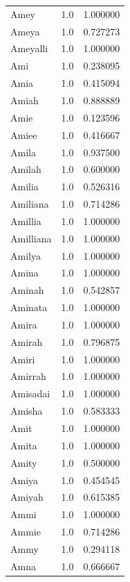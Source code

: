 \documentclass[
  letterpaper,
  DIV=11,
  numbers=noendperiod]{scrreprt}
\begin{document}
\begin{tabular}{lrr}
Amey            &   1.0 &   1.000000 \\
Ameya           &   1.0 &   0.727273 \\
Ameyalli        &   1.0 &   1.000000 \\
Ami             &   1.0 &   0.238095 \\
Amia            &   1.0 &   0.415094 \\
Amiah           &   1.0 &   0.888889 \\
Amie            &   1.0 &   0.123596 \\
Amiee           &   1.0 &   0.416667 \\
Amila           &   1.0 &   0.937500 \\
Amilah          &   1.0 &   0.600000 \\
Amilia          &   1.0 &   0.526316 \\
Amiliana        &   1.0 &   0.714286 \\
Amillia         &   1.0 &   1.000000 \\
Amilliana       &   1.0 &   1.000000 \\
Amilya          &   1.0 &   1.000000 \\
Amina           &   1.0 &   1.000000 \\
Aminah          &   1.0 &   0.542857 \\
Aminata         &   1.0 &   1.000000 \\
Amira           &   1.0 &   1.000000 \\
Amirah          &   1.0 &   0.796875 \\
Amiri           &   1.0 &   1.000000 \\
Amirrah         &   1.0 &   1.000000 \\
Amisadai        &   1.0 &   1.000000 \\
Amisha          &   1.0 &   0.583333 \\
Amit            &   1.0 &   1.000000 \\
Amita           &   1.0 &   1.000000 \\
Amity           &   1.0 &   0.500000 \\
Amiya           &   1.0 &   0.454545 \\
Amiyah          &   1.0 &   0.615385 \\
Ammi            &   1.0 &   1.000000 \\
Ammie           &   1.0 &   0.714286 \\
Ammy            &   1.0 &   0.294118 \\
Amna            &   1.0 &   0.666667 \\

\end{tabular}
\end{document}
